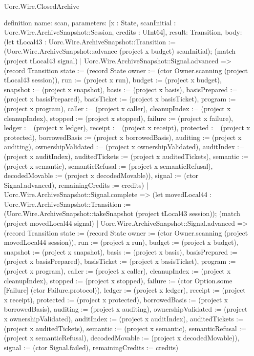 \begin{lexlean}{Uorc.Wire.ClosedArchive}
\begin{semanticmodule}
definition{
  name: scan,
  parameters: [x : State, scanInitial : Uorc.Wire.ArchiveSnapshot::Session, credits : UInt64],
  result: Transition,
  body: (let tLocal43 : Uorc.Wire.ArchiveSnapshot::Transition := (Uorc.Wire.ArchiveSnapshot::advance (project x budget) scanInitial); (match (project tLocal43 signal)
    | Uorc.Wire.ArchiveSnapshot::Signal.advanced => (record Transition {state := (record State {owner := (ctor Owner.scanning (project tLocal43 session)), run := (project x run), budget := (project x budget), snapshot := (project x snapshot), basis := (project x basis), basisPrepared := (project x basisPrepared), basisTicket := (project x basisTicket), program := (project x program), caller := (project x caller), cleanupIndex := (project x cleanupIndex), stopped := (project x stopped), failure := (project x failure), ledger := (project x ledger), receipt := (project x receipt), protected := (project x protected), borrowedBasis := (project x borrowedBasis), auditing := (project x auditing), ownershipValidated := (project x ownershipValidated), auditIndex := (project x auditIndex), auditedTickets := (project x auditedTickets), semantic := (project x semantic), semanticRefusal := (project x semanticRefusal), decodedMovable := (project x decodedMovable)}), signal := (ctor Signal.advanced), remainingCredits := credits})
    | Uorc.Wire.ArchiveSnapshot::Signal.complete => (let movedLocal44 : Uorc.Wire.ArchiveSnapshot::Transition := (Uorc.Wire.ArchiveSnapshot::takeSnapshot (project tLocal43 session)); (match (project movedLocal44 signal)
      | Uorc.Wire.ArchiveSnapshot::Signal.advanced => (record Transition {state := (record State {owner := (ctor Owner.scanning (project movedLocal44 session)), run := (project x run), budget := (project x budget), snapshot := (project x snapshot), basis := (project x basis), basisPrepared := (project x basisPrepared), basisTicket := (project x basisTicket), program := (project x program), caller := (project x caller), cleanupIndex := (project x cleanupIndex), stopped := (project x stopped), failure := (ctor Option.some [Failure] (ctor Failure.protocol)), ledger := (project x ledger), receipt := (project x receipt), protected := (project x protected), borrowedBasis := (project x borrowedBasis), auditing := (project x auditing), ownershipValidated := (project x ownershipValidated), auditIndex := (project x auditIndex), auditedTickets := (project x auditedTickets), semantic := (project x semantic), semanticRefusal := (project x semanticRefusal), decodedMovable := (project x decodedMovable)}), signal := (ctor Signal.failed), remainingCredits := credits})
}
\end{semanticmodule}
\end{lexlean}
